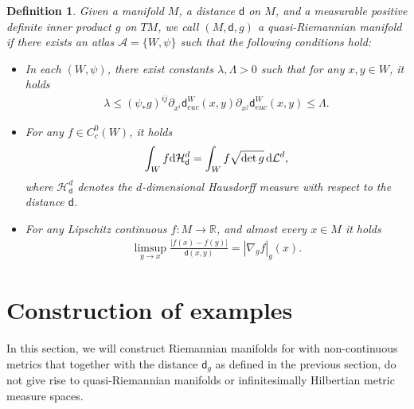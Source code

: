 \documentclass[a4paper,10pt]{article}
\newtheorem{definition}[theorem]{Definition}
\numberwithin{equation}{section}
\newcommand{\R}{\mathbb{R}}
\newcommand{\sfd}{\mathsf d}
\newcommand{\di}{{\rm d}}
\begin{document}
\begin{definition}\label{def:quasi_riemannian_manifold}
    Given a manifold $M$, a distance $\sfd$ on $M$, and a measurable positive definite inner product $g$ on $TM$, we  
  call  $(M, \sfd, g)$ a quasi-Riemannian manifold if there exists an atlas $\mathcal{A} = \{W, \psi\}$ such that the following conditions hold:
    \begin{itemize}
        \item[(i)]  In each $(W, \psi)$, there exist constants $\lambda, \Lambda > 0$ such that for any $x, y \in W$, it holds
        \begin{align*}
            \lambda \leq (\psi_*g)^{ij}\partial_{x^i}\sfd^W_{euc}(x, y)\partial_{x^j}\sfd^W_{euc}(x, y) \leq \Lambda.
        \end{align*}
        \item[(ii)] For any $f \in C^0_c(W)$, it holds \begin{align*}
            \int_W f \di \mathcal{H}^d_{\sfd} = \int_W f\sqrt{\det g}\,  \di \mathcal{L}^d,
        \end{align*}
        where $\mathcal{H}^d_{\sfd}$ denotes the $d$-dimensional Hausdorff measure with respect to the distance $\sfd$.
        \item[(iii)]  For any Lipschitz continuous $f: M \to \R$, 
 and almost every $x \in M$ it holds 
        \begin{align*}
            \limsup_{y \to x} \frac{|f(x)-f(y)|}{\sfd(x, y)} = |\nabla_g f|_g(x).
        \end{align*}
    \end{itemize}
\end{definition}
\section{Construction of examples}\label{sec:4}
In this section, we will construct Riemannian manifolds for with non-continuous metrics that together with the distance $\sfd_g$ as defined in the previous section, do not give rise to quasi-Riemannian manifolds or infinitesimally Hilbertian metric measure spaces.  
\end{document}
